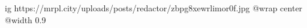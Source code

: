  
 
 
 
 

\ifcmt
  ig https://mrpl.city/uploads/posts/redactor/zbpg8xewrlimor0f.jpg
  @wrap center
  @width 0.9
\fi
